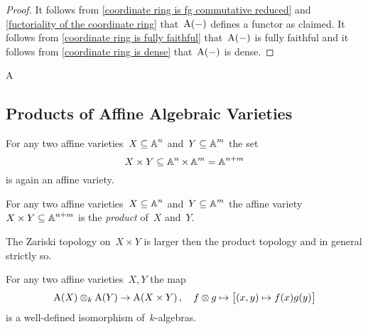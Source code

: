 \begin{proof}
  It follows from \cref{coordinate ring is fg commutative reduced} and \cref{fuctoriality of the coordinate ring} that~$\operatorname{A}(-)$ defines a functor as claimed.
  It follows from \cref{coordinate ring is fully faithful} that~$\operatorname{A}(-)$ is fully faithful and it follows from \cref{coordinate ring is dense} that~$\operatorname{A}(-)$ is dense.
\end{proof}


\begin{fluff}
  A
\end{fluff}




\subsection{Products of Affine Algebraic Varieties}


\begin{lemma}
  For any two affine varieties~$X \subseteq \operatorname{\mathbb{A}}^n$ and~$Y \subseteq \operatorname{\mathbb{A}}^m$ the set
  \[
              X \times Y
    \subseteq \operatorname{\mathbb{A}}^n \times \operatorname{\mathbb{A}}^m
    =         \operatorname{\mathbb{A}}^{n+m}
  \]
  is again an affine variety.
\end{lemma}




\begin{definition}
  For any two affine varieties~$X \subseteq \operatorname{\mathbb{A}}^n$ and~$Y \subseteq \operatorname{\mathbb{A}}^m$ the affine variety~$X \times Y \subseteq \operatorname{\mathbb{A}}^{n+m}$ is the \emph{product} of~$X$ and~$Y$.
\end{definition}


\begin{warning}
  The Zariski topology on~$X \times Y$ is larger then the product topology and in general strictly so.
\end{warning}


\begin{proposition}
  For any two affine varieties~$X,Y$ the map
  \[
            \operatorname{A}(X) \mathbin{\otimes}_k \operatorname{A}(Y)
    \to     \operatorname{A}(X \times Y) \,,
    \quad   f \mathbin{\otimes} g
    \mapsto \big[ (x,y) \mapsto f(x)g(y) \big]
  \]
  is a well-defined isomorphism of~$k$\nobreakdash-algebras.
\end{proposition}





